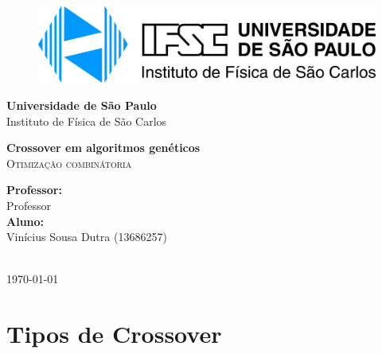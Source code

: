 \documentclass{article}
\newcommand{\theauthor}{Vinícius Sousa Dutra (13686257)}
\newcommand{\thetitle}{Crossover em algoritmos genéticos}
\begin{document}
\begin{titlepage}
    \begin{center}
        \begin{figure}[htb!]
            \centering
            \includegraphics[width=150mm]{images/ifsc_logo.jpg}
        \end{figure}
        \vspace{20pt}
        \LARGE{\textbf{Universidade de São Paulo}}\\
        \LARGE{Instituto de Física de São Carlos}\\

        \vspace{150pt}

        
        \LARGE{\textbf{{\thetitle}}} 
        \\ 
        \textsc{\LARGE Otimização combinátoria}
        \\
        
        
        \vspace{125pt}
        \begin{minipage}{\textwidth}
            \begin{flushleft} \large
                \textbf{Professor:}\\
                Professor\\[0.8cm]
                \textbf{Aluno:}\\
                \theauthor
                
                \end{flushleft}
                \end{minipage}\\[1 cm]
        \vspace{30pt}
        \vspace{\fill}  
        \Large {\today}

    \end{center}
\end{titlepage}

\newpage
\tableofcontents
\listoffigures
\listoftables
\listoflistings
\newpage
\section{Tipos de Crossover}

\cite{fishback2007taylor}


\end{document}
